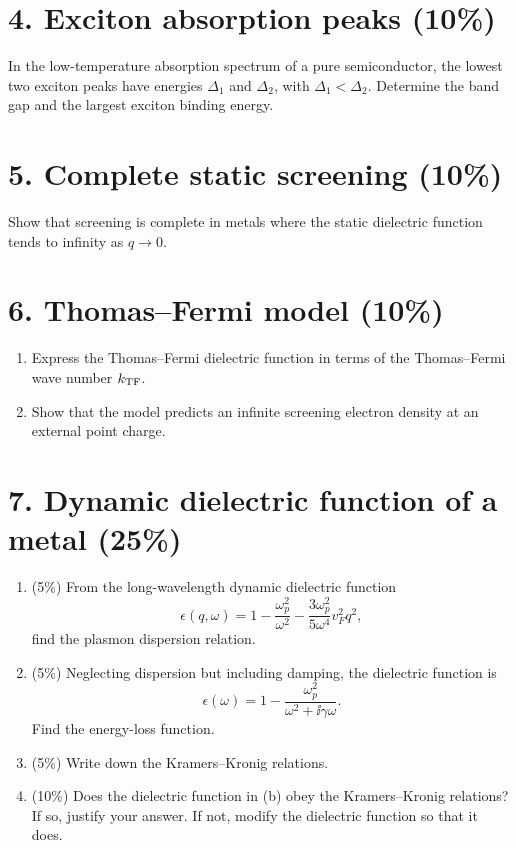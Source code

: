 \section*{4. Exciton absorption peaks (10\%)}
In the low-temperature absorption spectrum of a pure semiconductor, the lowest two exciton peaks have energies $\Delta_1$ and $\Delta_2$, with $\Delta_1<\Delta_2$. Determine the band gap and the largest exciton binding energy.

\section*{5. Complete static screening (10\%)}
Show that screening is complete in metals where the static dielectric function tends to infinity as $q\to0$.

\section*{6. Thomas--Fermi model (10\%)}
\begin{enumerate}[label=(\alph*)]
\item Express the Thomas--Fermi dielectric function in terms of the Thomas--Fermi wave number $k_{\rm TF}$.
\item Show that the model predicts an infinite screening electron density at an external point charge.
\end{enumerate}

\section*{7. Dynamic dielectric function of a metal (25\%)}
\begin{enumerate}[label=(\alph*)]
\item (5\%) From the long-wavelength dynamic dielectric function
\[
\epsilon(q,\omega)=1-\frac{\omega_p^2}{\omega^2}
-\frac{3\omega_p^2}{5\omega^4}v_F^2q^2,
\]
find the plasmon dispersion relation.
\item (5\%) Neglecting dispersion but including damping, the dielectric function is
\[
\epsilon(\omega)=1-\frac{\omega_p^2}{\omega^2+\ii\gamma\omega}.
\]
Find the energy-loss function.
\item (5\%) Write down the Kramers--Kronig relations.
\item (10\%) Does the dielectric function in (b) obey the Kramers--Kronig relations? If so, justify your answer. If not, modify the dielectric function so that it does.
\end{enumerate}
